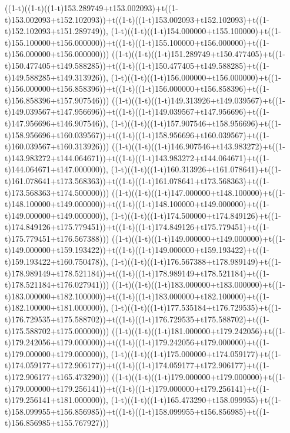 ((1-t)((1-t)((1-t)153.289749+t153.002093)+t((1-t)153.002093+t152.102093))+t((1-t)((1-t)153.002093+t152.102093)+t((1-t)152.102093+t151.289749)),                                     (1-t)((1-t)((1-t)154.000000+t155.100000)+t((1-t)155.100000+t156.000000))+t((1-t)((1-t)155.100000+t156.000000)+t((1-t)156.000000+t156.000000)))
((1-t)((1-t)((1-t)151.289749+t150.477405)+t((1-t)150.477405+t149.588285))+t((1-t)((1-t)150.477405+t149.588285)+t((1-t)149.588285+t149.313926)),                                     (1-t)((1-t)((1-t)156.000000+t156.000000)+t((1-t)156.000000+t156.858396))+t((1-t)((1-t)156.000000+t156.858396)+t((1-t)156.858396+t157.907546)))
((1-t)((1-t)((1-t)149.313926+t149.039567)+t((1-t)149.039567+t147.956696))+t((1-t)((1-t)149.039567+t147.956696)+t((1-t)147.956696+t146.907546)),                                     (1-t)((1-t)((1-t)157.907546+t158.956696)+t((1-t)158.956696+t160.039567))+t((1-t)((1-t)158.956696+t160.039567)+t((1-t)160.039567+t160.313926)))
((1-t)((1-t)((1-t)146.907546+t143.983272)+t((1-t)143.983272+t144.064671))+t((1-t)((1-t)143.983272+t144.064671)+t((1-t)144.064671+t147.000000)),                                     (1-t)((1-t)((1-t)160.313926+t161.078641)+t((1-t)161.078641+t173.568363))+t((1-t)((1-t)161.078641+t173.568363)+t((1-t)173.568363+t174.500000)))
((1-t)((1-t)((1-t)147.000000+t148.100000)+t((1-t)148.100000+t149.000000))+t((1-t)((1-t)148.100000+t149.000000)+t((1-t)149.000000+t149.000000)),                                     (1-t)((1-t)((1-t)174.500000+t174.849126)+t((1-t)174.849126+t175.779451))+t((1-t)((1-t)174.849126+t175.779451)+t((1-t)175.779451+t176.567388)))
((1-t)((1-t)((1-t)149.000000+t149.000000)+t((1-t)149.000000+t159.193422))+t((1-t)((1-t)149.000000+t159.193422)+t((1-t)159.193422+t160.750478)),                                     (1-t)((1-t)((1-t)176.567388+t178.989149)+t((1-t)178.989149+t178.521184))+t((1-t)((1-t)178.989149+t178.521184)+t((1-t)178.521184+t176.027941)))
((1-t)((1-t)((1-t)183.000000+t183.000000)+t((1-t)183.000000+t182.100000))+t((1-t)((1-t)183.000000+t182.100000)+t((1-t)182.100000+t181.000000)),                                     (1-t)((1-t)((1-t)177.535184+t176.729535)+t((1-t)176.729535+t175.588702))+t((1-t)((1-t)176.729535+t175.588702)+t((1-t)175.588702+t175.000000)))
((1-t)((1-t)((1-t)181.000000+t179.242056)+t((1-t)179.242056+t179.000000))+t((1-t)((1-t)179.242056+t179.000000)+t((1-t)179.000000+t179.000000)),                                     (1-t)((1-t)((1-t)175.000000+t174.059177)+t((1-t)174.059177+t172.906177))+t((1-t)((1-t)174.059177+t172.906177)+t((1-t)172.906177+t165.473290)))
((1-t)((1-t)((1-t)179.000000+t179.000000)+t((1-t)179.000000+t179.256141))+t((1-t)((1-t)179.000000+t179.256141)+t((1-t)179.256141+t181.000000)),                                     (1-t)((1-t)((1-t)165.473290+t158.099955)+t((1-t)158.099955+t156.856985))+t((1-t)((1-t)158.099955+t156.856985)+t((1-t)156.856985+t155.767927)))
